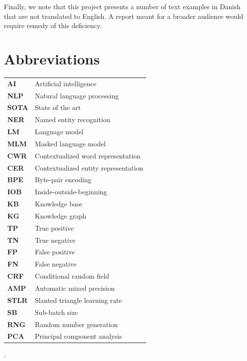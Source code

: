 \documentclass[12pt, fleqn]{report}
\newcommand{\abbrv}[2]{\vspace{0.2cm}\textbf{#1} & #2\\}
\begin{document}
Finally, we note that this project presents a number of text examples in Danish that are not translated to English.
A report meant for a broader audience would require remedy of this deficiency.

\chapter*{Abbreviations}
\begin{table}[H]
    \begin{tabular}{@{}l l}
        \abbrv{AI}{Artificial intelligence}
        \abbrv{NLP}{Natural language processing}
        \abbrv{SOTA}{State of the art}
        \abbrv{NER}{Named entity recognition}
        \abbrv{LM}{Language model}
        \abbrv{MLM}{Masked language model}
        \abbrv{CWR}{Contextualized word representation}
        \abbrv{CER}{Contextualized entity representation}
        \abbrv{BPE}{Byte-pair encoding}
        \abbrv{IOB}{Inside-outside-beginning}
        \abbrv{KB}{Knowledge base}
        \abbrv{KG}{Knowledge graph}
        \abbrv{TP}{True positive}
        \abbrv{TN}{True negative}
        \abbrv{FP}{False positive}
        \abbrv{FN}{False negative}
        \abbrv{CRF}{Conditional random field}
        \abbrv{AMP}{Automatic mixed precision}
        \abbrv{STLR}{Slanted triangle learning rate}
        \abbrv{SB}{Sub-batch size}
        \abbrv{RNG}{Random number generation}
        \abbrv{PCA}{Principal component analysis}
    \end{tabular}
\end{table}\noindent

\tableofcontents

\setlength{\headheight}{15pt}
\addtolength{\topmargin}{-2.5pt}.















\renewcommand*{\bibfont}{\normalfont\footnotesize}
\printbibliography[heading=bibintoc]

\appendix

\end{document}
